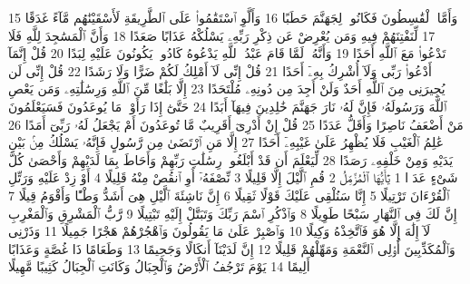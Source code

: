 {\tiny\colorbox{cl_aya}{15}} وَأَمَّا ٱلْقَٰسِطُونَ فَكَانُوا۟ لِجَهَنَّمَ حَطَبًا
{\tiny\colorbox{cl_aya}{16}} وَأَلَّوِ ٱسْتَقَٰمُوا۟ عَلَى ٱلطَّرِيقَةِ لَأَسْقَيْنَٰهُم مَّآءً غَدَقًا
{\tiny\colorbox{cl_aya}{17}} لِّنَفْتِنَهُمْ فِيهِ وَمَن يُعْرِضْ عَن ذِكْرِ رَبِّهِۦ يَسْلُكْهُ عَذَابًا صَعَدًا
{\tiny\colorbox{cl_aya}{18}} وَأَنَّ ٱلْمَسَٰجِدَ لِلَّهِ فَلَا تَدْعُوا۟ مَعَ ٱللَّهِ أَحَدًا
{\tiny\colorbox{cl_aya}{19}} وَأَنَّهُۥ لَمَّا قَامَ عَبْدُ ٱللَّهِ يَدْعُوهُ كَادُوا۟ يَكُونُونَ عَلَيْهِ لِبَدًا
{\tiny\colorbox{cl_aya}{20}} قُلْ إِنَّمَآ أَدْعُوا۟ رَبِّى وَلَآ أُشْرِكُ بِهِۦٓ أَحَدًا
{\tiny\colorbox{cl_aya}{21}} قُلْ إِنِّى لَآ أَمْلِكُ لَكُمْ ضَرًّا وَلَا رَشَدًا
{\tiny\colorbox{cl_aya}{22}} قُلْ إِنِّى لَن يُجِيرَنِى مِنَ ٱللَّهِ أَحَدٌ وَلَنْ أَجِدَ مِن دُونِهِۦ مُلْتَحَدًا
{\tiny\colorbox{cl_aya}{23}} إِلَّا بَلَٰغًا مِّنَ ٱللَّهِ وَرِسَٰلَٰتِهِۦ وَمَن يَعْصِ ٱللَّهَ وَرَسُولَهُۥ فَإِنَّ لَهُۥ نَارَ جَهَنَّمَ خَٰلِدِينَ فِيهَآ أَبَدًا
{\tiny\colorbox{cl_aya}{24}} حَتَّىٰٓ إِذَا رَأَوْا۟ مَا يُوعَدُونَ فَسَيَعْلَمُونَ مَنْ أَضْعَفُ نَاصِرًا وَأَقَلُّ عَدَدًا
{\tiny\colorbox{cl_aya}{25}} قُلْ إِنْ أَدْرِىٓ أَقَرِيبٌ مَّا تُوعَدُونَ أَمْ يَجْعَلُ لَهُۥ رَبِّىٓ أَمَدًا
{\tiny\colorbox{cl_aya}{26}} عَٰلِمُ ٱلْغَيْبِ فَلَا يُظْهِرُ عَلَىٰ غَيْبِهِۦٓ أَحَدًا
{\tiny\colorbox{cl_aya}{27}} إِلَّا مَنِ ٱرْتَضَىٰ مِن رَّسُولٍ فَإِنَّهُۥ يَسْلُكُ مِنۢ بَيْنِ يَدَيْهِ وَمِنْ خَلْفِهِۦ رَصَدًا
{\tiny\colorbox{cl_aya}{28}} لِّيَعْلَمَ أَن قَدْ أَبْلَغُوا۟ رِسَٰلَٰتِ رَبِّهِمْ وَأَحَاطَ بِمَا لَدَيْهِمْ وَأَحْصَىٰ كُلَّ شَىْءٍ عَدَدًۢا
{\tiny\colorbox{cl_aya}{1}} يَٰٓأَيُّهَا ٱلْمُزَّمِّلُ
{\tiny\colorbox{cl_aya}{2}} قُمِ ٱلَّيْلَ إِلَّا قَلِيلًا
{\tiny\colorbox{cl_aya}{3}} نِّصْفَهُۥٓ أَوِ ٱنقُصْ مِنْهُ قَلِيلًا
{\tiny\colorbox{cl_aya}{4}} أَوْ زِدْ عَلَيْهِ وَرَتِّلِ ٱلْقُرْءَانَ تَرْتِيلًا
{\tiny\colorbox{cl_aya}{5}} إِنَّا سَنُلْقِى عَلَيْكَ قَوْلًا ثَقِيلًا
{\tiny\colorbox{cl_aya}{6}} إِنَّ نَاشِئَةَ ٱلَّيْلِ هِىَ أَشَدُّ وَطْـًٔا وَأَقْوَمُ قِيلًا
{\tiny\colorbox{cl_aya}{7}} إِنَّ لَكَ فِى ٱلنَّهَارِ سَبْحًا طَوِيلًا
{\tiny\colorbox{cl_aya}{8}} وَٱذْكُرِ ٱسْمَ رَبِّكَ وَتَبَتَّلْ إِلَيْهِ تَبْتِيلًا
{\tiny\colorbox{cl_aya}{9}} رَّبُّ ٱلْمَشْرِقِ وَٱلْمَغْرِبِ لَآ إِلَٰهَ إِلَّا هُوَ فَٱتَّخِذْهُ وَكِيلًا
{\tiny\colorbox{cl_aya}{10}} وَٱصْبِرْ عَلَىٰ مَا يَقُولُونَ وَٱهْجُرْهُمْ هَجْرًا جَمِيلًا
{\tiny\colorbox{cl_aya}{11}} وَذَرْنِى وَٱلْمُكَذِّبِينَ أُو۟لِى ٱلنَّعْمَةِ وَمَهِّلْهُمْ قَلِيلًا
{\tiny\colorbox{cl_aya}{12}} إِنَّ لَدَيْنَآ أَنكَالًا وَجَحِيمًا
{\tiny\colorbox{cl_aya}{13}} وَطَعَامًا ذَا غُصَّةٍ وَعَذَابًا أَلِيمًا
{\tiny\colorbox{cl_aya}{14}} يَوْمَ تَرْجُفُ ٱلْأَرْضُ وَٱلْجِبَالُ وَكَانَتِ ٱلْجِبَالُ كَثِيبًا مَّهِيلًا
